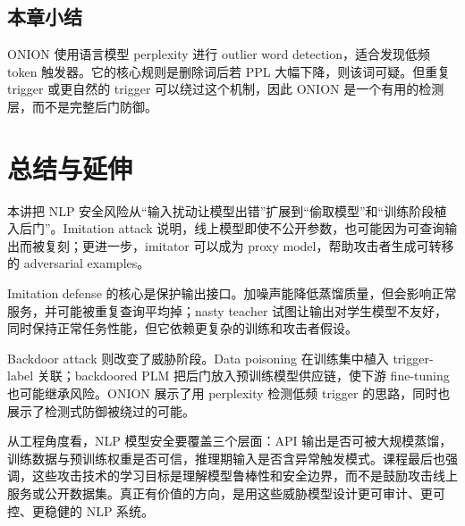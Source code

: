 \documentclass[a4paper]{article}
\begin{document}
\subsection{本章小结}

ONION 使用语言模型 perplexity 进行 outlier word detection，适合发现低频 token 触发器。它的核心规则是删除词后若 PPL 大幅下降，则该词可疑。但重复 trigger 或更自然的 trigger 可以绕过这个机制，因此 ONION 是一个有用的检测层，而不是完整后门防御。

\section{总结与延伸}

本讲把 NLP 安全风险从“输入扰动让模型出错”扩展到“偷取模型”和“训练阶段植入后门”。Imitation attack 说明，线上模型即使不公开参数，也可能因为可查询输出而被复刻；更进一步，imitator 可以成为 proxy model，帮助攻击者生成可转移的 adversarial examples。

Imitation defense 的核心是保护输出接口。加噪声能降低蒸馏质量，但会影响正常服务，并可能被重复查询平均掉；nasty teacher 试图让输出对学生模型不友好，同时保持正常任务性能，但它依赖更复杂的训练和攻击者假设。

Backdoor attack 则改变了威胁阶段。Data poisoning 在训练集中植入 trigger-label 关联；backdoored PLM 把后门放入预训练模型供应链，使下游 fine-tuning 也可能继承风险。ONION 展示了用 perplexity 检测低频 trigger 的思路，同时也展示了检测式防御被绕过的可能。

从工程角度看，NLP 模型安全要覆盖三个层面：API 输出是否可被大规模蒸馏，训练数据与预训练权重是否可信，推理期输入是否含异常触发模式。课程最后也强调，这些攻击技术的学习目标是理解模型鲁棒性和安全边界，而不是鼓励攻击线上服务或公开数据集。真正有价值的方向，是用这些威胁模型设计更可审计、更可控、更稳健的 NLP 系统。
\end{document}

